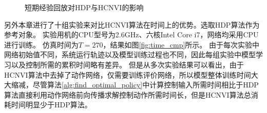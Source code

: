 \begin{figure}[htb]
\centering 
    \caption{短期经验回放对HDP与HCNVI的影响 }
    \label{fig:stable_replay_cmp}
\end{figure}

另外本章进行了十组实验来对比HCNVI算法在时间上的优势。选取HDP算法作为参考对象。
实验用机的CPU型号为2.6GHz、六核Intel Core i7，网络均采用CPU进行训练。
仿真时间为$T=270$，结果如图\ref{fig:time_cmp}所示。
由于每次实验中网络初始值不同，系统运行轨迹以及模型训练过程也不同，因此每组实验中模型学习以及控制所需的累积时间略有差异。
但是从多次实验结果可以看出，由于
HCNVI算法中去掉了动作网络，仅需要训练评价网络，所以模型整体训练时间大大缩减，尽管算法\ref{alg:find_optimal_policy}中计算控制输入所需时间相比于HDP算法直接利用动作网络前向传播求解控制动作所需时间长，但是HCNVI算法总消耗时间明显少于HDP算法。

